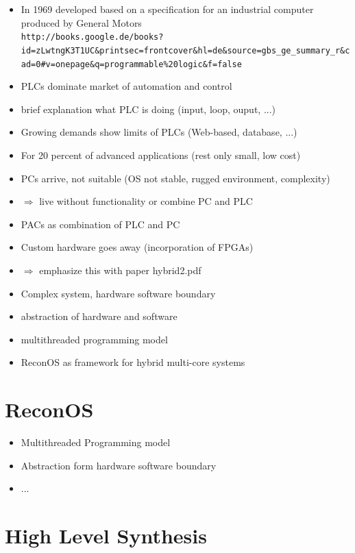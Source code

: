 \begin{itemize}
\item In 1969 developed based on a specification for an industrial computer  produced by General Motors \citep{par99}\\
\lstinline{http://books.google.de/books?id=zLwtngK3T1UC&printsec=frontcover&hl=de&source=gbs_ge_summary_r&cad=0#v=onepage&q=programmable%20logic&f=false}
\item \acp{PLC} dominate market of automation and control
\item brief explanation what PLC is doing (input, loop, ouput, ...)
\item Growing demands show limits of \acp{PLC} (Web-based, database, ...)
\item For 20 percent of advanced applications (rest only small, low cost)

\item PCs arrive, not suitable (OS not stable, rugged environment, complexity)
\item $\Rightarrow$ live without functionality or combine PC and PLC
\item \acp{PAC} as combination of PLC and PC
\item Custom hardware goes away (incorporation of FPGAs)
\item $\Rightarrow$ emphasize this with paper hybrid2.pdf
\item Complex system, hardware software boundary
\item abstraction of hardware and software
\item multithreaded programming model
\item ReconOS as framework for hybrid multi-core systems
\end{itemize}

\section{ReconOS}
\begin{itemize}
\item Multithreaded Programming model
\item Abstraction form hardware software boundary
\item ...
\end{itemize}

\section{High Level Synthesis}